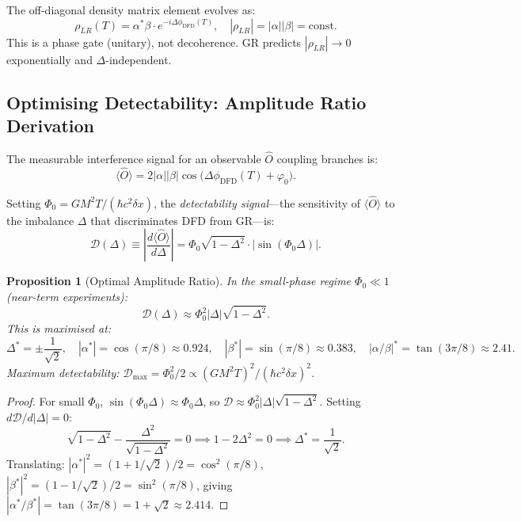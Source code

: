 \documentclass[11pt]{article}
\newtheorem{proposition}[theorem]{Proposition}
\theoremstyle{definition}
\theoremstyle{remark}
\begin{document}
The off-diagonal density matrix element evolves as:
\begin{equation}
  \rho_{LR}(T) = \alpha^*\beta\cdot e^{-i\Delta\phi_{\mathrm{DFD}}(T)},
  \quad |\rho_{LR}| = |\alpha||\beta| = \text{const.}
\end{equation}
This is a phase gate (unitary), not decoherence.  GR predicts
$|\rho_{LR}|\to 0$ exponentially and $\Delta$-independent.

\subsection{Optimising Detectability: Amplitude Ratio Derivation}

The measurable interference signal for an observable $\hat{O}$ coupling
branches is:
\begin{equation}
  \langle\hat{O}\rangle = 2|\alpha||\beta|\cos\bigl(\Delta\phi_{\mathrm{DFD}}(T)
  + \varphi_0\bigr). \label{eq:observable}
\end{equation}

Setting $\Phi_0 = GM^2T/(\hbar c^2\delta x)$, the
\textit{detectability signal}---the sensitivity of $\langle\hat{O}\rangle$
to the imbalance $\Delta$ that discriminates DFD from GR---is:
\begin{equation}
  \mathcal{D}(\Delta) \equiv \left|\frac{d\langle\hat{O}\rangle}{d\Delta}\right|
  = \Phi_0\sqrt{1-\Delta^2}\cdot|\sin(\Phi_0\Delta)|.
  \label{eq:detectability}
\end{equation}

\begin{proposition}[Optimal Amplitude Ratio]
\label{prop:optimal-ratio}
In the small-phase regime $\Phi_0\ll1$ (near-term experiments):
\begin{equation}
  \mathcal{D}(\Delta)\approx\Phi_0^2|\Delta|\sqrt{1-\Delta^2}.
\end{equation}
This is maximised at:
\begin{equation}
  \boxed{
  \Delta^* = \pm\frac{1}{\sqrt{2}},\quad
  |\alpha^*| = \cos(\pi/8)\approx0.924,\quad
  |\beta^*| = \sin(\pi/8)\approx0.383,\quad
  |\alpha/\beta|^* = \tan(3\pi/8)\approx2.41.
  }\label{eq:optimal-ratio}
\end{equation}
Maximum detectability:
$\mathcal{D}_{\max} = \Phi_0^2/2 \propto (GM^2T)^2/(\hbar c^2\delta x)^2$.
\end{proposition}

\begin{proof}
For small $\Phi_0$, $\sin(\Phi_0\Delta)\approx\Phi_0\Delta$, so
$\mathcal{D}\approx\Phi_0^2|\Delta|\sqrt{1-\Delta^2}$.  Setting
$d\mathcal{D}/d|\Delta|=0$:
\begin{equation}
  \sqrt{1-\Delta^2} - \frac{\Delta^2}{\sqrt{1-\Delta^2}} = 0
  \implies 1 - 2\Delta^2 = 0 \implies \Delta^* = \frac{1}{\sqrt{2}}.
\end{equation}
Translating: $|\alpha^*|^2 = (1+1/\sqrt{2})/2 = \cos^2(\pi/8)$,
$|\beta^*|^2 = (1-1/\sqrt{2})/2 = \sin^2(\pi/8)$, giving
$|\alpha^*/\beta^*| = \tan(3\pi/8) = 1+\sqrt{2} \approx 2.414$.
\end{proof}
\end{document}
